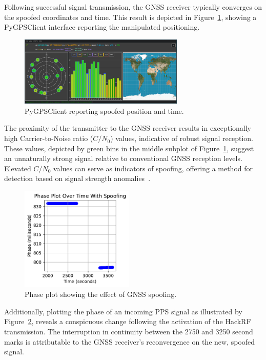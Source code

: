 \documentclass[12pt, a4paper]{extarticle}
\begin{document}
Following successful signal transmission, the GNSS receiver typically converges
on the spoofed coordinates and time. This result is depicted in
Figure~\ref{fig:pygpsclient-spoofed}, showing a PyGPSClient interface reporting
the manipulated positioning.

\begin{figure}[h]
    \centering
    \includegraphics[width=0.7\textwidth]{pygpsclient-spoofed}
    \caption{PyGPSClient reporting spoofed position and time.}
    \label{fig:pygpsclient-spoofed}
\end{figure}


The proximity of the transmitter to the GNSS receiver results in exceptionally
high Carrier-to-Noise ratio ($C/N_0$) values, indicative of robust signal
reception. These values, depicted by green bins in the middle subplot of
Figure~\ref{fig:pygpsclient-spoofed}, suggest an unnaturally strong signal
relative to conventional GNSS reception levels. Elevated $C/N_0$ values can
serve as indicators of spoofing, offering a method for detection based on
signal strength anomalies~\cite{cn01,cn02}.

\begin{figure}
    \centering
    \includegraphics[width=0.48\textwidth]{phases-spoofed}
    \captionsetup{width=0.40\textwidth}
    \caption{Phase plot showing the effect of GNSS spoofing.}
    \label{fig:phases-spoofed}
\end{figure}


Additionally, plotting the phase of an incoming PPS signal as illustrated by
Figure~\ref{fig:phases-spoofed}, reveals a conspicuous change following the
activation of the HackRF transmission. The interruption in continuity between
the 2750 and 3250 second marks is attributable to the GNSS receiver's
reconvergence on the new, spoofed signal.
\end{document}
